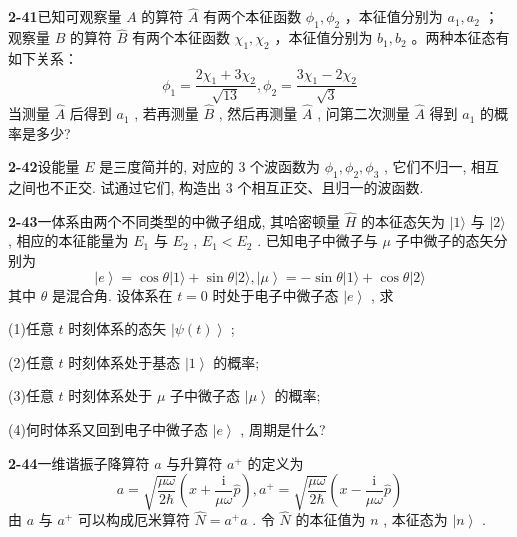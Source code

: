 \vfill

\newpage

\textbf{2-41}\quad 已知可观察量 $\displaystyle A$ 的算符 $\displaystyle \hat{A}$ 有两个本征函数 $\displaystyle \phi_1, \phi_2$ ，本征值分别为 $\displaystyle a_1, a_2$ ；观察量 $\displaystyle B$ 的算符 $\displaystyle \hat{B}$ 有两个本征函数 $\displaystyle \chi_1, \chi_2$ ，本征值分别为 $\displaystyle b_1, b_2$ 。两种本征态有如下关系：
$$
\phi_ {1} = \dfrac {2 \chi_ {1} + 3 \chi_ {2}}{\sqrt {13}}, \phi_ {2} = \dfrac {3 \chi_ {1} - 2 \chi_ {2}}{\sqrt {3}}
$$
当测量 $\displaystyle \hat{A}$ 后得到 $\displaystyle a_1$ , 若再测量 $\displaystyle \hat{B}$ , 然后再测量 $\displaystyle \hat{A}$ , 问第二次测量 $\displaystyle \hat{A}$ 得到 $\displaystyle a_1$ 的概率是多少?

\vfill

\newpage

\textbf{2-42}\quad 设能量 $\displaystyle E$ 是三度简并的, 对应的 3 个波函数为 $\displaystyle \phi_1, \phi_2, \phi_3$ , 它们不归一, 相互之间也不正交. 试通过它们, 构造出 3 个相互正交、且归一的波函数.

\vfill

\newpage

\textbf{2-43}\quad 一体系由两个不同类型的中微子组成, 其哈密顿量 $\displaystyle \hat{H}$ 的本征态矢为 $\displaystyle |1\rangle$ 与 $\displaystyle |2\rangle$ , 相应的本征能量为 $\displaystyle E_1$ 与 $\displaystyle E_2$ , $\displaystyle E_1 < E_2$ . 已知电子中微子与 $\displaystyle \mu$ 子中微子的态矢分别为
$$
\left| e \right\rangle = \cos \theta | 1 \rangle + \sin \theta | 2 \rangle , \left| \mu \right\rangle = - \sin \theta | 1 \rangle + \cos \theta | 2 \rangle
$$
其中 $\displaystyle \theta$ 是混合角. 设体系在 $\displaystyle t = 0$ 时处于电子中微子态 $\displaystyle \left|e\right\rangle$ , 求

(1)任意 $\displaystyle t$ 时刻体系的态矢 $\displaystyle \left|\psi(t)\right\rangle$ ;

(2)任意 $\displaystyle t$ 时刻体系处于基态 $\displaystyle \left|1\right\rangle$ 的概率;

(3)任意 $\displaystyle t$ 时刻体系处于 $\displaystyle \mu$ 子中微子态 $\displaystyle \left|\mu\right\rangle$ 的概率;

(4)何时体系又回到电子中微子态 $\displaystyle \left|e\right\rangle$ , 周期是什么?

\vfill

\newpage

\textbf{2-44}\quad 一维谐振子降算符 $\displaystyle a$ 与升算符 $\displaystyle a^{+}$ 的定义为
\begin{equation}\tag{1}
a = \sqrt {\dfrac {\mu \omega}{2 \hbar}} \left(x + \dfrac {\mathrm{i}}{\mu \omega} \hat {p}\right), a ^ {+} = \sqrt {\dfrac {\mu \omega}{2 \hbar}} \left(x - \dfrac {\mathrm{i}}{\mu \omega} \hat {p}\right)
\end{equation}
由 $\displaystyle a$ 与 $\displaystyle a^{+}$ 可以构成厄米算符 $\displaystyle \hat{N} = a^{+}a$ . 令 $\displaystyle \hat{N}$ 的本征值为 $\displaystyle n$ , 本征态为 $\displaystyle \left|n\right\rangle$ .

